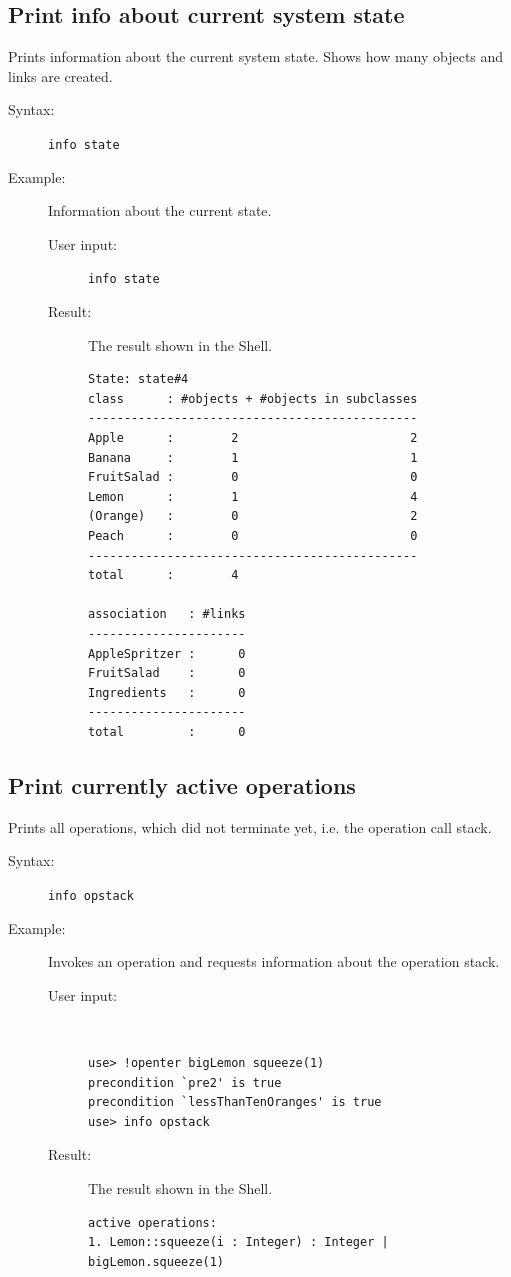 \documentclass[a4paper,titlepage,oneside,final]{scrreprt} %
\begin{document}
\subsection{Print info about current system state}
Prints information about the current system state.
Shows how many objects and links are created.
\begin{description}
\item[Syntax:] \verb+info state+
\item[Example:] Information about the current state.
\begin{description}
\item[User input:]\verb+info state+
\item[Result:] The result shown in the Shell.
\begin{verbatim}
State: state#4
class      : #objects + #objects in subclasses
----------------------------------------------
Apple      :        2                        2
Banana     :        1                        1
FruitSalad :        0                        0
Lemon      :        1                        4
(Orange)   :        0                        2
Peach      :        0                        0
----------------------------------------------
total      :        4

association   : #links
----------------------
AppleSpritzer :      0
FruitSalad    :      0
Ingredients   :      0
----------------------
total         :      0
\end{verbatim}
\end{description}
\end{description}
\subsection{Print currently active operations}
Prints all operations, which did not terminate yet, i.e. the operation call stack.
\begin{description}
\item[Syntax:] \verb+info opstack+
\item[Example:] Invokes an operation and requests information about the operation stack.
\begin{description}
\item[User input:]~
\begin{verbatim}
use> !openter bigLemon squeeze(1)
precondition `pre2' is true
precondition `lessThanTenOranges' is true
use> info opstack
\end{verbatim}
\item[Result:] The result shown in the Shell.
\begin{verbatim}
active operations:
1. Lemon::squeeze(i : Integer) : Integer | bigLemon.squeeze(1)
\end{verbatim}
\end{description}
\end{description}
\end{document}
